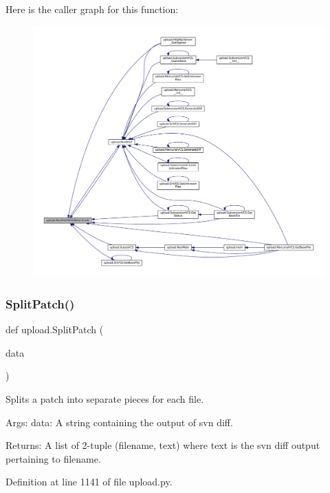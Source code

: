 Here is the caller graph for this function\+:
\nopagebreak
\begin{figure}[H]
\begin{center}
\leavevmode
\includegraphics[width=350pt]{namespaceupload_afa542d3a5a4f4fce174a1c23644a9204_icgraph}
\end{center}
\end{figure}
\mbox{\label{namespaceupload_a9dd260785ca4cc97e245234811ef1949}} 
\subsubsection{\texorpdfstring{Split\+Patch()}{SplitPatch()}}
{\footnotesize\ttfamily def upload.\+Split\+Patch (\begin{DoxyParamCaption}\item[{}]{data }\end{DoxyParamCaption})}

\begin{DoxyVerb}Splits a patch into separate pieces for each file.

Args:
  data: A string containing the output of svn diff.

Returns:
  A list of 2-tuple (filename, text) where text is the svn diff output
    pertaining to filename.
\end{DoxyVerb}
 

Definition at line 1141 of file upload.\+py.



